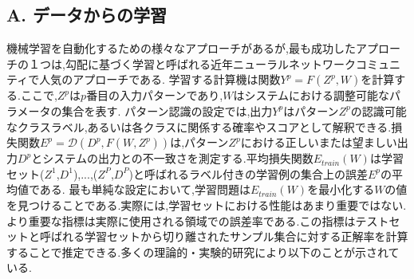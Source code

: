 \documentclass[twocolumn]{jarticle}     %
\begin{document}
\subsection*{A. データからの学習}
機械学習を自動化するための様々なアプローチがあるが,最も成功したアプローチの１つは,勾配に基づく学習と呼ばれる近年ニューラルネットワークコミュニティで人気のアプローチである.
学習する計算機は関数$Y^p = F(Z^p,W)$を計算する.ここで,$Z^p$は$p$番目の入力パターンであり,$W$はシステムにおける調整可能なパラメータの集合を表す.
パターン認識の設定では,出力$Y^p$はパターン$Z^p$の認識可能なクラスラベル,あるいは各クラスに関係する確率やスコアとして解釈できる.損失関数$E^p = \mathcal{D}(D^p,F(W,Z^p))$は,パターン$Z^p$における正しいまたは望ましい出力$D^p$とシステムの出力との不一致さを測定する.平均損失関数$E_{train}(W)$は学習セット{($Z^1$,$D^1$),...,($Z^P$,$D^P$)}と呼ばれるラベル付きの学習例の集合上の誤差$E^p$の平均値である.
最も単純な設定において,学習問題は$E_{train}(W)$を最小化する$W$の値を見つけることである.実際には,学習セットにおける性能はあまり重要ではない.より重要な指標は実際に使用される領域での誤差率である.この指標はテストセットと呼ばれる学習セットから切り離されたサンプル集合に対する正解率を計算することで推定できる.多くの理論的・実験的研究\cite{3,4,5}により以下のことが示されている.







\end{document}
